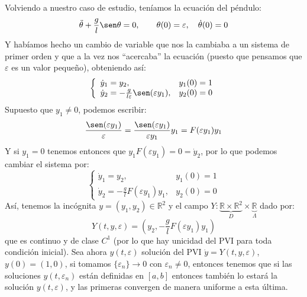 \noindent
Volviendo a nuestro caso de estudio, teníamos la ecuación del péndulo:
\begin{equation*}
    \ddot{\theta} + \frac{g}{l}\sen\theta = 0, \qquad \theta(0) = \varepsilon,\quad \dot{\theta}(0) = 0
\end{equation*}
Y habíamos hecho un cambio de variable que nos la cambiaba a un sistema de primer orden y que a la vez nos ``acercaba'' la ecuación (puesto que pensamos que $\varepsilon$ es un valor pequeño), obteniendo así:
\begin{equation*}
    \left\{\begin{array}{ll}
        \dot{y}_1 = y_2, & y_1(0) = 1 \\
        \dot{y}_2 = -\frac{g}{l\varepsilon}\sen(\varepsilon y_1), & y_2(0) = 0
    \end{array}\right.
\end{equation*}
Supuesto que $y_1\neq 0$, podemos escribir:
\begin{equation*}
    \frac{\sen(\varepsilon y_1)}{\varepsilon} = \frac{\sen(\varepsilon y_1)}{\varepsilon y_1} y_1 = F(\varepsilon y_1) y_1
\end{equation*}
Y si $y_1 = 0$ tenemos entonces que $y_1F(\varepsilon y_1) = 0 = \dot{y}_2$, por lo que podemos cambiar el sistema por:
\begin{equation*}
    \left\{\begin{array}{ll}
        \dot{y}_1 = y_2, & y_1(0) = 1 \\
        \dot{y}_2 = -\frac{g}{l}F(\varepsilon y_1)y_1, & y_2(0) = 0
    \end{array}\right.
\end{equation*}
Así, tenemos la incógnita $y = (y_1, y_2)\in \mathbb{R}^2$ y el campo $Y:\underbrace{\mathbb{R}\times \mathbb{R}^2}_{D}\times\underbrace{\mathbb{R}}_{\Lambda}$ dado por:
\begin{equation*}
    Y(t,y,\varepsilon) = \left(y_2, -\frac{g}{l}F(\varepsilon y_1)y_1\right)
\end{equation*}
que es continuo y de clase $C^1$ (por lo que hay unicidad del PVI para toda condición inicial). Sea ahora $y(t,\varepsilon)$ solución del PVI $\dot{y} = Y(t,y,\varepsilon)$, $y(0) = (1,0)$, si tomamos $\{\varepsilon_n\}\to 0$ con $\varepsilon_n\neq 0$, entonces tenemos que si las soluciones $y(t,\varepsilon_n)$ están definidas en $[a,b]$ entonces también lo estará la solución $y(t,\varepsilon)$, y las primeras convergen de manera uniforme a esta última.\\

